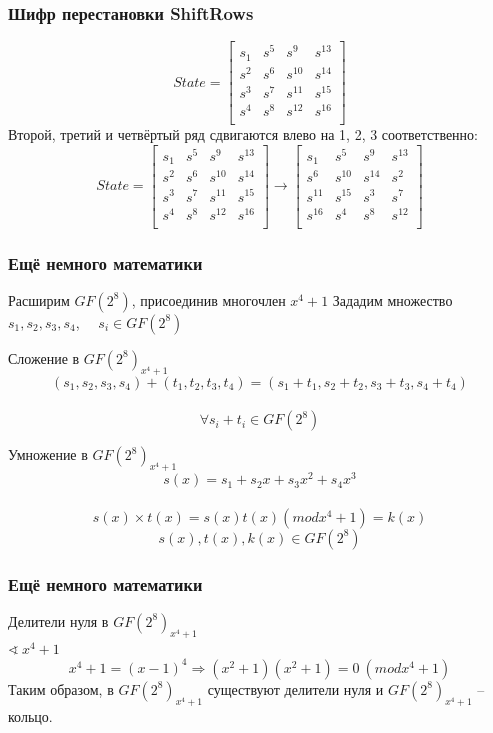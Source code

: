 \documentclass[10pt, typeface=serif(roman), pdf,hyperref={unicode}, aspectratio=169]{beamer}
\begin{document}
\begin{frame}
	\frametitle{Шифр перестановки ShiftRows}
	\[State =
	\begin{bmatrix}
		s_1 & s^5 & s^9 & s^{13} \\
		s^2 & s^6 & s^{10} & s^{14} \\
		s^3 & s^7 & s^{11} & s^{15} \\
		s^4 & s^8 & s^{12} & s^{16} \\
	\end{bmatrix}\]
	Второй, третий и четвёртый ряд сдвигаются влево на 1, 2, 3 соответственно:
	\[State =
	\begin{bmatrix}
		s_1 & s^5 & s^9 & s^{13} \\
		s^2 & s^6 & s^{10} & s^{14} \\
		s^3 & s^7 & s^{11} & s^{15} \\
		s^4 & s^8 & s^{12} & s^{16} \\
	\end{bmatrix}
	\rightarrow
	\begin{bmatrix}
		s_1 & s^5 & s^9 & s^{13} \\
		s^6 & s^{10} & s^{14} & s^2\\
		s^{11} & s^{15} & s^3 & s^7\\
		s^{16} & s^4 & s^8 & s^{12}\\
	\end{bmatrix}\]
\end{frame}




\begin{frame}
	\frametitle{Ещё немного математики}
	Расширим \(GF(2^8)\), присоединив многочлен \(x^4+1\)
	Зададим множество \(s_1,s_2,s_3,s_4\), ~~\(s_i \in GF(2^8)\)
	\begin{block}
		{
			Сложение в \( GF(2^8)_{x^4+1}\)
		}
		\[ (s_1,s_2,s_3,s_4) + (t_1,t_2,t_3,t_4) = (s_1+t_1,s_2+t_2,s_3+t_3,s_4+t_4)\] \\
		\[\forall s_i+t_i \in GF(2^8)\]
	\end{block}
	\begin{block}
		{
			Умножение в \( GF(2^8)_{x^4+1}\)
		}
		\[ s(x) = s_1+s_2x+s_3x^2+s_4x^3\] \\
		\[s(x) \times t(x) = s(x)t(x) (mod x^4+1) = k(x)\]
		\[s(x),t(x),k(x) \in GF(2^8)\]
	\end{block}
\end{frame}



\begin{frame}
	\frametitle{Ещё немного математики}
	\begin{block}
		{
			Делители нуля в \(GF(2^8)_{x^4+1}\)\\
			\(\sphericalangle ~x^4+1\) 
		}
		\[x^4+1 = (x-1)^4 \Rightarrow (x^2 + 1)(x^2+1) = 0 ~(mod x^4+1)\]
		Таким образом, в \( GF(2^8)_{x^4+1}\) существуют делители нуля и \( GF(2^8)_{x^4+1}\) -- кольцо.
	\end{block}
\end{frame}
\end{document}
